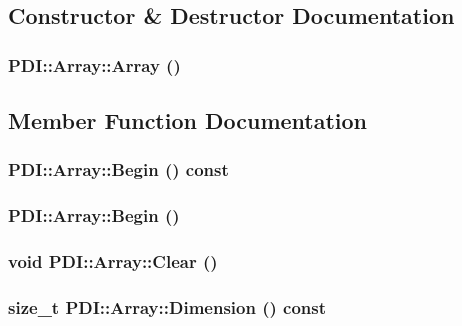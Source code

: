 \subsection{Constructor \& Destructor Documentation}
\hypertarget{class_p_d_i_1_1_array_33df64c314416b547065804689da7f74}{
\subsubsection[{Array}]{\setlength{\rightskip}{0pt plus 5cm}PDI::Array::Array ()}}
\label{class_p_d_i_1_1_array_33df64c314416b547065804689da7f74}




\subsection{Member Function Documentation}
\hypertarget{class_p_d_i_1_1_array_12672e30c0112d1b8c0ae240f5c6faa3}{
\subsubsection[{Begin}]{ PDI::Array::Begin () const}}
\label{class_p_d_i_1_1_array_12672e30c0112d1b8c0ae240f5c6faa3}


\hypertarget{class_p_d_i_1_1_array_f110c3266836cccdf9b6d52131386d07}{
\subsubsection[{Begin}]{ PDI::Array::Begin ()}}
\label{class_p_d_i_1_1_array_f110c3266836cccdf9b6d52131386d07}


\hypertarget{class_p_d_i_1_1_array_c0d7acf6d14997afb0f93b08db683d11}{
\subsubsection[{Clear}]{\setlength{\rightskip}{0pt plus 5cm}void PDI::Array::Clear ()}}
\label{class_p_d_i_1_1_array_c0d7acf6d14997afb0f93b08db683d11}


\hypertarget{class_p_d_i_1_1_array_d17e03ace992a6d0e57bab451fd0dda6}{
\subsubsection[{Dimension}]{\setlength{\rightskip}{0pt plus 5cm}size\_\-t PDI::Array::Dimension () const}}
\label{class_p_d_i_1_1_array_d17e03ace992a6d0e57bab451fd0dda6}


